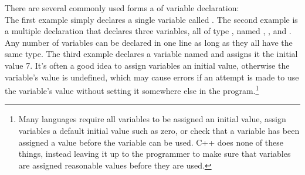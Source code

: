 There are several commonly used forms a of variable declaration:\\
The first example simply declares a single variable called .  The second example is a multiple declaration that declares three variables, all of type , named , , and .  Any number of variables can be declared in one line as long as they all have the same type.  The third example declares a variable named  and assigns it the initial value 7.  It's often a good idea to assign variables an initial value, otherwise the variable's value is undefined, which may cause errors if an attempt is made to use the variable's value without setting it somewhere else in the program.\footnote{Many languages require all variables to be assigned an initial value, assign variables a default initial value such as zero, or check that a variable has been assigned a value before the variable can be used.  C++ does none of these things, instead leaving it up to the programmer to make sure that variables are assigned reasonable values before they are used.}


